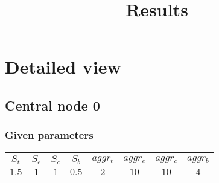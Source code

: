 \documentclass{article}
\title{Results}
\begin{document}
\maketitle
\section{Detailed view}
\subsection{Central node 0}
\subsubsection{Given parameters}
\begin{table}[H]
\centering
\begin{tabular}{@{}cccc|cccc@{}}
\toprule
$S_t$ & $S_e$ & $S_c$ & $S_b$ & $aggr_t$ & $aggr_e$ & $aggr_c$ & $aggr_b$\\
\midrule
$1.5$ & $1$ & $1$ & $0.5$ & $2$ & $10$ & $10$ & $4$\\
\bottomrule
\end{tabular}
\end{table}
\end{document}

